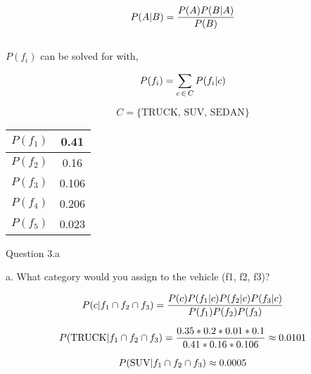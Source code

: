 \documentclass{article}
\begin{document}
\begin{equation} %
		\nonumber \bayes{A}{B}
		\label{Bayes' Theorem}
\end{equation} \\


$P(f_i)$ can be solved for with,

\begin{equation}
	\nonumber P(f_i) = \sum_{c \, \in \, C}{P(f_i|c)}
\end{equation}

\begin{equation}
\nonumber C =  \{ \text{TRUCK, SUV, SEDAN} \}
\end{equation}

%
%

\begin{center}
 \begin{tabular}{||c c ||} 
 \hline
 $P(f_1)$&0.41\\
 \hline
 $P(f_2)$&0.16\\
 \hline
 $P(f_3)$&0.106\\
 \hline
 $P(f_4)$&0.206\\
 \hline
 $P(f_5)$ & 0.023\\ [1ex] 
 \hline
\end{tabular}
\end{center}



\begin{center} Question 3.a \end{center}

a. 	What category would you assign to the vehicle (f1, f2, f3)?

\begin{equation}
	\nonumber P(c|f_1 \cap f_2 \cap f_3) = \frac{P(c) P(f_1|c)P(f_2|c)P(f_3|c)}{P(f_1)P(f_2)P(f_3)}
\end{equation}

\begin{equation}
	\nonumber P(\text{TRUCK}|f_1 \cap f_2 \cap f_3) = \frac{0.35 * 0.2 * 0.01 * 0.1 }{0.41 * 0.16 * 0.106} \approx 0.0101
\end{equation}

\begin{equation}
	\nonumber P(\text{SUV}|f_1 \cap f_2 \cap f_3) \approx 0.0005
\end{equation}
\end{document}
